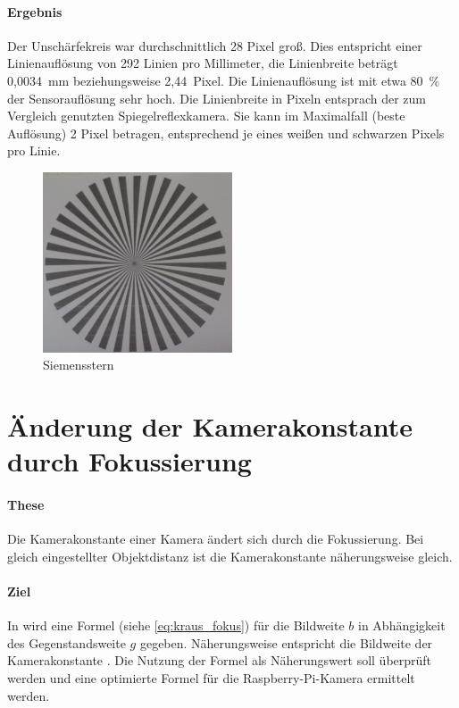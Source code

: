 \documentclass[./00PhotoBox.tex]{subfiles}
\begin{document}
\paragraph{Ergebnis}

Der Unschärfekreis war durchschnittlich 28 Pixel groß. Dies entspricht einer Linienauflösung von 292 Linien pro Millimeter, die Linienbreite beträgt 0,0034~mm beziehungsweise 2,44~Pixel. Die Linienauflösung ist mit etwa 80~\% der Sensorauflösung sehr hoch. Die Linienbreite in Pixeln entsprach der zum Vergleich genutzten Spiegelreflexkamera. Sie kann im Maximalfall (beste Auflösung) 2 Pixel betragen, entsprechend je eines weißen und schwarzen Pixels pro Linie.

\begin{figure}
    \centering
    \includegraphics[width=0.5\textwidth]{./img/siemens.jpg}
    \caption{Siemensstern} %
    \label{img:siemens} %
\end{figure}


\section{Änderung der Kamerakonstante durch Fokussierung}
\label{sec:fokus}

\paragraph{These}
Die Kamerakonstante einer Kamera ändert sich durch die Fokussierung. Bei gleich eingestellter Objektdistanz ist die Kamerakonstante näherungsweise gleich.

\paragraph{Ziel}
In \citet[S. 59]{kraus} wird eine Formel (siehe \autoref{eq:kraus_fokus}) für die \Gls{Bildweite} $b$ in Abhängigkeit des Gegenstandsweite $g$ gegeben. Näherungsweise entspricht die Bildweite der Kamerakonstante \citep[S. 59]{kraus}. Die Nutzung der Formel als Näherungswert soll überprüft werden und eine optimierte Formel für die Raspberry-Pi-Kamera ermittelt werden.
\end{document}
